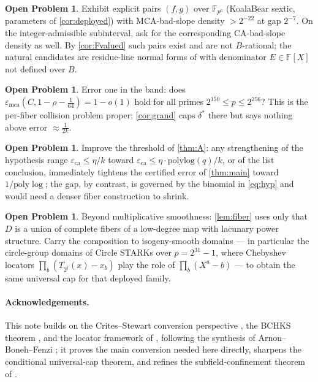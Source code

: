 \documentclass[11pt]{article}
\theoremstyle{definition}
\newtheorem{problem}[theorem]{Open Problem}
\theoremstyle{remark}
\newcommand{\F}{\mathbb{F}}
\newcommand{\B}{B}
\newcommand{\eca}{\varepsilon_{\mathrm{ca}}}
\newcommand{\emca}{\varepsilon_{\mathrm{mca}}}
\begin{document}
\begin{problem}\label{prob:explicit}
Exhibit explicit pairs $(f,g)$ over $\F_{p^6}$ (KoalaBear sextic, parameters of \cref{cor:deployed}) with MCA-bad-slope density $>2^{-22}$ at gap $2^{-7}$. On the integer-admissible subinterval, ask for the corresponding CA-bad-slope density as well. By \cref{cor:Fvalued} such pairs exist and are not $\B$-rational; the natural candidates are residue-line normal forms of \cite{Cho26b} with denominator $E\in\F[X]$ not defined over $\B$.
\end{problem}

\begin{problem}\label{prob:errorone}
Error one in the band: does $\emca(C,1-\rho-\frac1{64})=1-o(1)$ hold for all primes $2^{150}\le p\le2^{256}$? This is the per-fiber collision problem proper; \cref{cor:grand} caps $\delta^*$ there but says nothing above error $\approx\frac1{2k}$.
\end{problem}

\begin{problem}
Improve the threshold of \cref{thm:A}: any strengthening of the hypothesis range $\eca\le\eta/k$ toward $\eca\le\eta\cdot\mathrm{polylog}(q)/k$, or of the list conclusion, immediately tightens the certified error of \cref{thm:main} toward $1/\mathrm{poly}\log$; the gap, by contrast, is governed by the binomial in \eqref{eq:hyp} and would need a denser fiber construction to shrink.
\end{problem}

\begin{problem}
Beyond multiplicative smoothness: \cref{lem:fiber} uses only that $D$ is a union of complete fibers of a low-degree map with lacunary power structure. Carry the composition to isogeny-smooth domains --- in particular the circle-group domains of Circle STARKs over $p=2^{31}-1$, where Chebyshev locators $\prod_b(T_{2^j}(x)-x_b)$ play the role of $\prod_b(X^a-b)$ --- to obtain the same universal cap for that deployed family.
\end{problem}

\paragraph{Acknowledgements.} This note builds on the Crites--Stewart conversion perspective \cite{CS25}, the BCHKS theorem \cite{BCHKS25}, and the locator framework of \cite{Cho26a,Cho26b}, following the synthesis of Arnon--Boneh--Fenzi \cite{ABF26}; it proves the main conversion needed here directly, sharpens the conditional universal-cap theorem, and refines the subfield-confinement theorem of \cite{Cho26b}.
\end{document}
